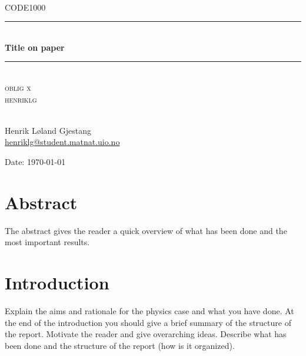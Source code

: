 \documentclass[english, a4paper]{report}
\begin{document}
\begin{titlepage}
\begin{center}

\textsc{}\\[1.0cm]
\textsc{\Large CODE1000}\\[0.5cm]
\rule{\linewidth}{0.5mm} \\[0.4cm]
{ \huge \bfseries Title on paper}\\[0.10cm]
\rule{\linewidth}{0.5mm} \\[1.5cm]
\textsc{\Large oblig x}\\
\medbreak
\textsc{\Large henriklg}\\
\textsc{}\\[7.0cm]

\begin{minipage}{0.69\textwidth}
    \begin{center} \large
        Henrik Løland Gjestang\\ \url{henriklg@student.matnat.uio.no} \\[0.8cm]
    \end{center}
\end{minipage}
\vfill

\large{Date: \today}
\end{center}
\end{titlepage}

\section*{Abstract}
 The abstract gives the reader a quick overview of what has been done and the most important results.

\tableofcontents
\newpage




\section{Introduction}
Explain the aims and rationale for the physics case and what you have done. At the end of the introduction you should give a brief summary of the structure of the report. Motivate the reader and give overarching ideas. Describe what has been done and the structure of the report (how is it organized).
\end{document}
